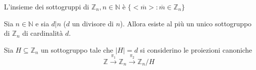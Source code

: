         \begin{corollary}
            L'insieme dei sottogruppi di $\mathbb{Z}_n, n \in \mathbb{N}$ è $\{<\overline{m}>: \overline{m} \in \mathbb{Z}_n\}$ 
        \end{corollary}
        \begin{proposition}
            Sia $n \in \mathbb{N}$ e sia $d|n$ ($d$ un divisore di $n$). Allora esiste al più un unico sottogruppo di $\mathbb{Z}_n$ di cardinalità $d$.
        \end{proposition}
        \begin{dimos*}
            Sia $H \subseteq \mathbb{Z}_n$ un sottogruppo tale che $|H|=d$ si considerino le proiezioni canoniche $$\mathbb{Z} \xrightarrow{\pi_1} \mathbb{Z}_n \xrightarrow{\pi_2} \mathbb{Z}_n/H$$ 
        \end{dimos*}
